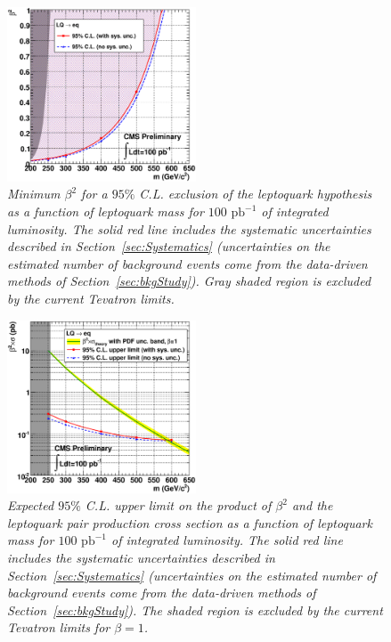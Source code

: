\begin{figure}[h!]
 \centering
  \includegraphics[width=0.5\textwidth]{plots/cmsPotential/beta2_vs_m_excl.eps}
 \caption{\small \sl Minimum $\beta^2$ for
a $95\%$ C.L. exclusion of the leptoquark hypothesis as a function of leptoquark mass for $100\text{ pb}^{-1}$ of integrated luminosity. 
The solid red line includes the systematic uncertainties described in Section~\ref{sec:Systematics}
(uncertainties on the estimated number of background events come from the data-driven methods of Section~\ref{sec:bkgStudy}).
Gray shaded region is excluded by the current Tevatron limits.
\label{fig:exclusion_beta}}
\end{figure}


\begin{figure}[h!]
 \centering
  \includegraphics[width=0.5\textwidth]{plots/cmsPotential/xs95CL_vs_m_log.eps}
 \caption{\small \sl Expected $95\%$ C.L. upper limit on the product of $\beta^2$ and the leptoquark pair production cross section 
as a function of leptoquark mass for $100\text{ pb}^{-1}$ of integrated luminosity. 
The solid red line includes the systematic uncertainties described in Section~\ref{sec:Systematics}
(uncertainties on the estimated number of background events come from the data-driven methods of Section~\ref{sec:bkgStudy}).
The shaded region is excluded by the current Tevatron limits for $\beta=1$.
\label{fig:exclusion_xs}}
\end{figure}


